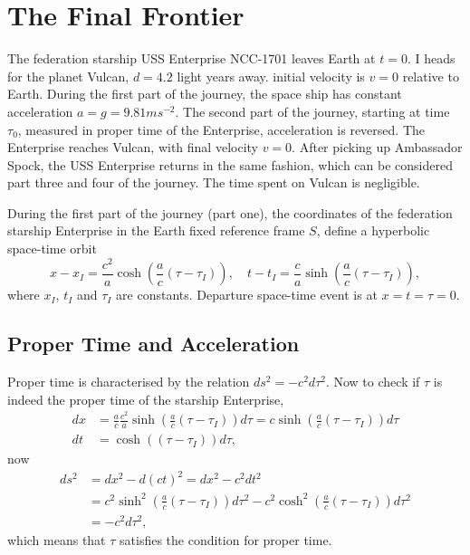 \documentclass[11pt]{amsart}
\begin{document}
\section{The Final Frontier}
The federation starship USS Enterprise NCC-1701 leaves Earth at $t=0$. I heads for the planet Vulcan, $d=4.2$ light years away. initial velocity is $v=0$ relative to Earth. During the first part of the journey, the space ship has constant acceleration $a = g = 9.81 ms^{-2}$. The second part of the journey, starting at time $\tau_0$, measured in proper time of the Enterprise, acceleration is reversed. The Enterprise reaches Vulcan, with final velocity $v=0$. After picking up Ambassador Spock, the USS Enterprise returns in the same fashion, which can be considered part three and four of the journey. The time spent on Vulcan is negligible.

During the first part of the journey (part one), the coordinates of the federation starship Enterprise in the Earth fixed reference frame $S$, define a hyperbolic space-time orbit
\begin{equation}
\label{eq:pathofenterprise}
x-x_I = \frac{c^2}{a}\cosh\left(\frac{a}{c}(\tau-\tau_I) \right), \quad 
t - t_I = \frac{c}{a}\sinh\left(\frac{a}{c}(\tau - \tau_I) \right),
\end{equation}
where $x_I$, $t_I$ and $\tau_I$ are constants. Departure space-time event is at $x=t=\tau=0$.

\subsection{Proper Time and Acceleration}
Proper time is characterised by the relation $ds^2 = -c^2d\tau^2$. Now to check if $\tau$ is indeed the proper time of the starship Enterprise,
\begin{align*}
dx &= \frac{a}{c}\frac{c^2}{a}\sinh\left(\frac{a}{c}(\tau-\tau_I) \right)d\tau
= c\sinh\left(\frac{a}{c}(\tau - \tau_I) \right)d\tau \\
dt &= \cosh \left((\tau - \tau_I) \right)d\tau,
\end{align*}
now
\begin{align*}
ds^2 &= dx^2 - d(ct)^2 = dx^2 - c^2dt^2 \\ 
 	&= c^2\sinh^2\left(\frac{a}{c}(\tau - \tau_I)\right)d\tau^2 - c^2\cosh^2\left(\frac{a}{c}(\tau - \tau_I)\right)d\tau^2 \\
 	&= -c^2d\tau^2,
\end{align*}
which means that $\tau$ satisfies the condition for proper time.
\end{document}

